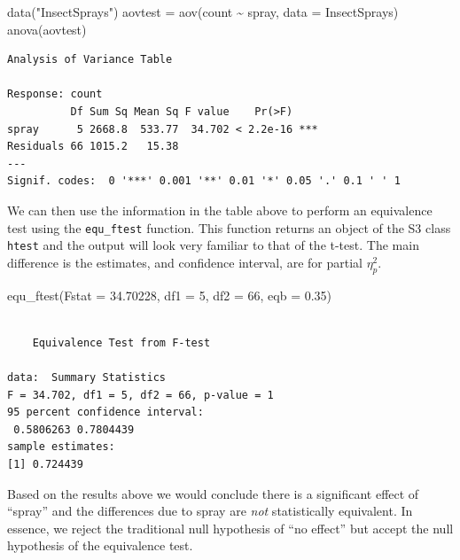 \documentclass[
]{interact}
\newenvironment{Shaded}{\begin{snugshade}}{\end{snugshade}}
\newcommand{\AttributeTok}[1]{\textcolor[rgb]{0.40,0.45,0.13}{#1}}
\newcommand{\DecValTok}[1]{\textcolor[rgb]{0.68,0.00,0.00}{#1}}
\newcommand{\FloatTok}[1]{\textcolor[rgb]{0.68,0.00,0.00}{#1}}
\newcommand{\FunctionTok}[1]{\textcolor[rgb]{0.28,0.35,0.67}{#1}}
\newcommand{\NormalTok}[1]{\textcolor[rgb]{0.00,0.23,0.31}{#1}}
\newcommand{\OtherTok}[1]{\textcolor[rgb]{0.00,0.23,0.31}{#1}}
\newcommand{\SpecialCharTok}[1]{\textcolor[rgb]{0.37,0.37,0.37}{#1}}
\newcommand{\StringTok}[1]{\textcolor[rgb]{0.13,0.47,0.30}{#1}}
\begin{document}
\begin{Shaded}
\begin{Highlighting}[]
\FunctionTok{data}\NormalTok{(}\StringTok{"InsectSprays"}\NormalTok{)}
\NormalTok{aovtest }\OtherTok{=} \FunctionTok{aov}\NormalTok{(count }\SpecialCharTok{\textasciitilde{}}\NormalTok{ spray, }\AttributeTok{data =}\NormalTok{ InsectSprays)}
\FunctionTok{anova}\NormalTok{(aovtest)}
\end{Highlighting}
\end{Shaded}

\begin{verbatim}
Analysis of Variance Table

Response: count
          Df Sum Sq Mean Sq F value    Pr(>F)    
spray      5 2668.8  533.77  34.702 < 2.2e-16 ***
Residuals 66 1015.2   15.38                      
---
Signif. codes:  0 '***' 0.001 '**' 0.01 '*' 0.05 '.' 0.1 ' ' 1
\end{verbatim}

We can then use the information in the table above to perform an
equivalence test using the \texttt{equ\_ftest} function. This function
returns an object of the S3 class \texttt{htest} and the output will
look very familiar to that of the t-test. The main difference is the
estimates, and confidence interval, are for partial \(\eta^2_p\).

\begin{Shaded}
\begin{Highlighting}[]
\FunctionTok{equ\_ftest}\NormalTok{(}\AttributeTok{Fstat =} \FloatTok{34.70228}\NormalTok{,  }\AttributeTok{df1 =} \DecValTok{5}\NormalTok{, }\AttributeTok{df2 =} \DecValTok{66}\NormalTok{,  }\AttributeTok{eqb =} \FloatTok{0.35}\NormalTok{)}
\end{Highlighting}
\end{Shaded}

\begin{verbatim}

    Equivalence Test from F-test

data:  Summary Statistics
F = 34.702, df1 = 5, df2 = 66, p-value = 1
95 percent confidence interval:
 0.5806263 0.7804439
sample estimates:
[1] 0.724439
\end{verbatim}

Based on the results above we would conclude there is a significant
effect of ``spray'' and the differences due to spray are \emph{not}
statistically equivalent. In essence, we reject the traditional null
hypothesis of ``no effect'' but accept the null hypothesis of the
equivalence test.
\end{document}
